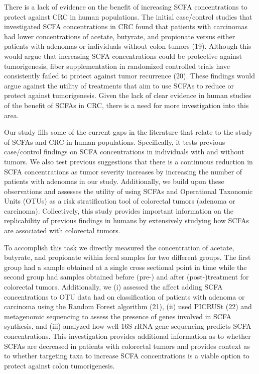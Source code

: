 \documentclass[11pt,]{article}
\begin{document}
There is a lack of evidence on the benefit of increasing SCFA
concentrations to protect against CRC in human populations. The initial
case/control studies that investigated SCFA concentrations in CRC found
that patients with carcinomas had lower concentrations of acetate,
butyrate, and propionate versus either patients with adenomas or
individuals without colon tumors (19). Although this would argue that
increasing SCFA concentrations could be protective against
tumorigenesis, fiber supplementation in randomized controlled trials
have consistently failed to protect against tumor recurrence (20). These
findings would argue against the utility of treatments that aim to use
SCFAs to reduce or protect against tumorigenesis. Given the lack of
clear evidence in human studies of the benefit of SCFAs in CRC, there is
a need for more investigation into this area.

Our study fills some of the current gaps in the literature that relate
to the study of SCFAs and CRC in human populations. Specifically, it
tests previous case/control findings on SCFA concentrations in
individuals with and without tumors. We also test previous suggestions
that there is a continuous reduction in SCFA concentrations as tumor
severity increases by increasing the number of patients with adenomas in
our study. Additionally, we build upon these observations and assesses
the utility of using SCFAs and Operational Taxonomic Units (OTUs) as a
risk stratification tool of colorectal tumors (adenoma or carcinoma).
Collectively, this study provides important information on the
replicability of previous findings in humans by extensively studying how
SCFAs are associated with colorectal tumors.

To accomplish this task we directly measured the concentration of
acetate, butyrate, and propionate within fecal samples for two different
groups. The first group had a sample obtained at a single cross
sectional point in time while the second group had samples obtained
before (pre-) and after (post-)treatment for colorectal tumors.
Additionally, we (i) assessed the affect adding SCFA concentrations to
OTU data had on classification of patients with adenoma or carcinoma
using the Random Forest algorithm (21), (ii) used PICRUSt (22) and
metagenomic sequencing to assess the presence of genes involved in SCFA
synthesis, and (iii) analyzed how well 16S rRNA gene sequencing predicts
SCFA concentrations. This investigation provides additional information
as to whether SCFAs are decreased in patients with colorectal tumors and
provides context as to whether targeting taxa to increase SCFA
concentrations is a viable option to protect against colon
tumorigenesis.
\end{document}
